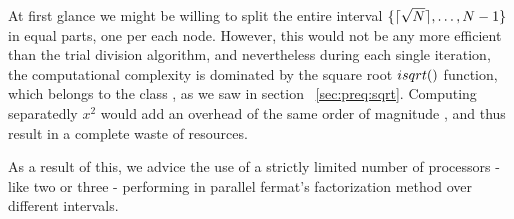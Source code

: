 At first glance we might be willing to split the entire interval
$\{ \lceil\sqrt{N}\rceil, \ldots, N-1 \}$ in equal parts, one per each
node. However, this would not be any more efficient than the trial division
algorithm, and nevertheless during each single iteration, the computational
complexity is dominated by the square root $\dsqrt$ function, which belongs to
the class , as we saw in section ~\ref{sec:preq:sqrt}.
Computing separatedly $x^2$ would add an overhead of the same order of magnitude
, and thus result in a complete waste of resources.

As a result of this, we advice the use of a strictly limited number of
processors - like two or three - performing in parallel fermat's factorization
method over different intervals.
